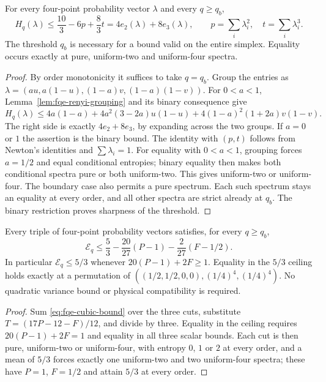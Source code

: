 \begin{proposition}
\label{prop:fqe-cubic-bound}
For every four-point probability vector $\lambda$ and every $q\ge q_b$,
\[
H_q(\lambda)\le\frac{10}3-6p+\frac83t
=4e_2(\lambda)+8e_3(\lambda),\qquad
p=\sum_i\lambda_i^2,\quad t=\sum_i\lambda_i^3.
\tag{CB}\label{eq:fqe-cubic-bound}
\]
The threshold $q_b$ is necessary for a bound valid on the entire simplex.
Equality occurs exactly at pure, uniform-two and uniform-four spectra.
\end{proposition}
\begin{proof}
By order monotonicity it suffices to take $q=q_b$.
Group the entries as
$\lambda=(au,a(1-u),(1-a)v,(1-a)(1-v))$.
For $0<a<1$, Lemma~\ref{lem:fqe-renyi-grouping} and its binary consequence give
\[
H_q(\lambda)\le4a(1-a)
+4a^2(3-2a)u(1-u)+4(1-a)^2(1+2a)v(1-v).
\]
The right side is exactly $4e_2+8e_3$, by expanding across the two groups.
If $a=0$ or $1$ the assertion is the binary bound.
The identity with $(p,t)$ follows from Newton's identities and $\sum\lambda_i=1$.
For equality with $0<a<1$, grouping forces $a=1/2$ and equal conditional
entropies; binary equality then makes both conditional spectra pure or
both uniform-two. This gives uniform-two or uniform-four. The boundary
case also permits a pure spectrum. Each such spectrum stays an equality
at every order, and all other spectra are strict already at $q_b$.
The binary restriction proves sharpness of the threshold.
\end{proof}

\begin{corollary}
\label{cor:fqe-renyi-high-f}
Every triple of four-point probability vectors satisfies, for every $q\ge q_b$,
\[
\mathcal E_q\le\frac53-\frac{20}{27}(P-1)
-\frac2{27}(F-1/2).
\tag{HC}\label{eq:fqe-renyi-high-f}
\]
In particular $\mathcal E_q\le5/3$ whenever $20(P-1)+2F\ge1$.
Equality in the $5/3$ ceiling holds exactly at a permutation of
$((1/2,1/2,0,0),(1/4)^4,(1/4)^4)$.
No quadratic variance bound or physical compatibility is required.
\end{corollary}
\begin{proof}
Sum \eqref{eq:fqe-cubic-bound} over the three cuts, substitute
$T=(17P-12-F)/12$, and divide by three.
Equality in the ceiling requires $20(P-1)+2F=1$ and equality in all three
scalar bounds. Each cut is then pure, uniform-two or uniform-four, with entropy
$0$, $1$ or $2$ at every order, and a mean of $5/3$ forces exactly one uniform-two and two
uniform-four spectra; these have $P=1$, $F=1/2$ and attain $5/3$ at every order.
\end{proof}
